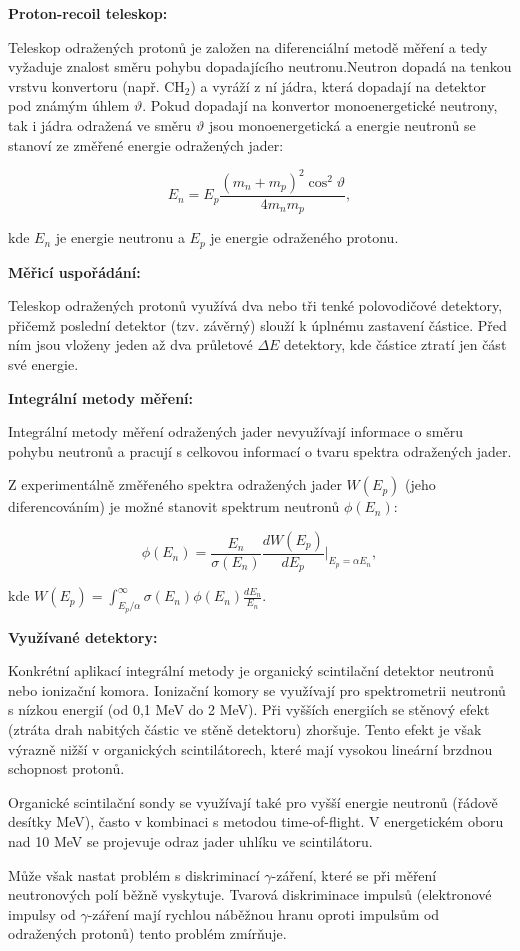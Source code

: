 \textbf{Proton-recoil teleskop:}

Teleskop odražených protonů je založen na diferenciální metodě měření a tedy vyžaduje znalost směru pohybu dopadajícího neutronu.Neutron dopadá na tenkou vrstvu konvertoru (např. CH$_2$) a vyráží z ní jádra, která dopadají na detektor pod známým úhlem $\vartheta$. Pokud dopadají na konvertor monoenergetické neutrony, tak i jádra odražená ve směru $\vartheta$ jsou monoenergetická a energie neutronů se stanoví ze změřené energie odražených jader:

\begin{equation}
    E_n = E_p \frac{(m_n + m_p)^2 \cos^2 \vartheta}{4 m_n m_p},
\end{equation}

kde $E_n$ je energie neutronu a $E_p$ je energie odraženého protonu.

\textbf{Měřicí uspořádání:}

Teleskop odražených protonů využívá dva nebo tři tenké polovodičové detektory, přičemž poslední detektor (tzv. závěrný) slouží k úplnému zastavení částice. Před ním jsou vloženy jeden až dva průletové $\Delta E$ detektory, kde částice ztratí jen část své energie.

\textbf{Integrální metody měření:}

Integrální metody měření odražených jader nevyužívají informace o směru pohybu neutronů a pracují s celkovou informací o tvaru spektra odražených jader.

Z experimentálně změřeného spektra odražených jader $W(E_p)$ (jeho diferencováním) je možné stanovit spektrum neutronů $\phi(E_n)$:

\begin{equation}
    \phi(E_n) = \frac{E_n}{\sigma(E_n)} \frac{dW(E_p)}{dE_p} \Bigg|_{E_p = \alpha E_n},
\end{equation}

kde $W(E_p) = \int_{E_p / \alpha}^\infty \sigma(E_n) \phi(E_n) \frac{dE_n}{E_n}.$

\textbf{Využívané detektory:}

Konkrétní aplikací integrální metody je organický scintilační detektor neutronů nebo ionizační komora. Ionizační komory se využívají pro spektrometrii neutronů s nízkou energií (od 0,1 MeV do 2 MeV). Při vyšších energiích se stěnový efekt (ztráta drah nabitých částic ve stěně detektoru) zhoršuje. Tento efekt je však výrazně nižší v organických scintilátorech, které mají vysokou lineární brzdnou schopnost protonů.

Organické scintilační sondy se využívají také pro vyšší energie neutronů (řádově desítky MeV), často v kombinaci s metodou time-of-flight. V energetickém oboru nad 10 MeV se projevuje odraz jader uhlíku ve scintilátoru.

Může však nastat problém s diskriminací $\gamma$-záření, které se při měření neutronových polí běžně vyskytuje. Tvarová diskriminace impulsů (elektronové impulsy od $\gamma$-záření mají rychlou náběžnou hranu oproti impulsům od odražených protonů) tento problém zmírňuje.
